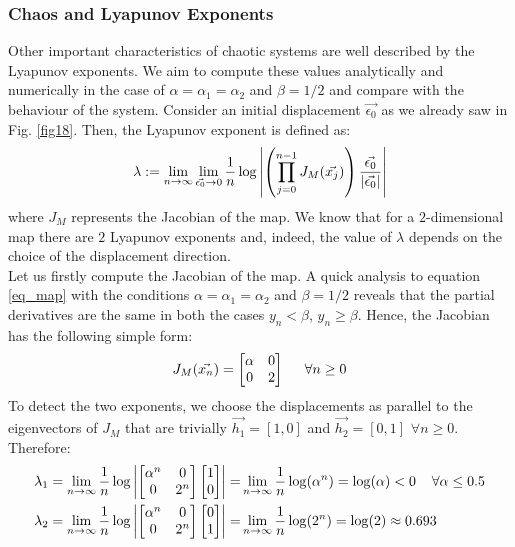 \documentclass[11pt,titlepage]{article}
\begin{document}
\subsubsection{Chaos and Lyapunov Exponents}
Other important characteristics of chaotic systems are well described by the Lyapunov exponents. We aim to compute these values analytically and numerically in the case of $\alpha=\alpha_1=\alpha_2$ and $\beta=1/2$ and compare with the behaviour of the system. Consider an initial displacement $\vec{\epsilon_0}$ as we already saw in Fig. \ref{fig18}. Then, the Lyapunov exponent is defined as:
\begin{equation*}
	\lambda := \lim_{n\rightarrow \infty} \lim_{\vec{\epsilon_0} \rightarrow 0 } \frac{1}{n} \log \abs{\left( \prod_{j=0}^{n-1} J_M(\vec{x_j})\right) \frac{\vec{\epsilon_0}}{\abs{\vec{\epsilon_0}}}}
\end{equation*}
where $J_M$ represents the Jacobian of the map. We know that for a $2$-dimensional map there are $2$ Lyapunov exponents and, indeed, the value of $\lambda$ depends on the choice of the displacement direction. \\
Let us firstly compute the Jacobian of the map. A quick analysis to equation \ref{eq_map} with the conditions $\alpha=\alpha_1=\alpha_2$ and $\beta=1/2$ reveals that the partial derivatives are the same in both the cases $y_n < \beta$, $y_n \ge \beta$. Hence, the Jacobian has the following simple form:
\begin{equation*}
	J_M(\vec{x_n}) = \begin{bmatrix} \alpha & 0 \\ 0 & 2\end{bmatrix} \hspace{5mm} \forall n \ge 0 
\end{equation*}
To detect the two exponents, we choose the displacements as parallel to the eigenvectors of $J_M$ that are trivially $\vec{h_1}=[1,0]$ and $\vec{h_2}=[0,1]$ $\forall n\ge0$. Therefore:
\begin{equation*}
	\begin{aligned}
		\lambda_1 = \lim_{n\rightarrow \infty} \frac{1}{n} \log \abs{\begin{bmatrix} \alpha^n & 0 \\ 0 & 2^n\end{bmatrix} \begin{bmatrix} 1 \\ 0\end{bmatrix} } =& \lim_{n\rightarrow \infty} \frac{1}{n} \log (\alpha^n) = \log(\alpha)  < 0 \hspace{4mm} \forall \alpha \le 0.5\\
		\lambda_2 = \lim_{n\rightarrow \infty} \frac{1}{n} \log \abs{\begin{bmatrix} \alpha^n & 0 \\ 0 & 2^n\end{bmatrix} \begin{bmatrix} 0 \\ 1\end{bmatrix} } =& \lim_{n\rightarrow \infty} \frac{1}{n} \log (2^n) = \log(2) \approx 0.693 \\
	\end{aligned}
\end{equation*}
\end{document}
